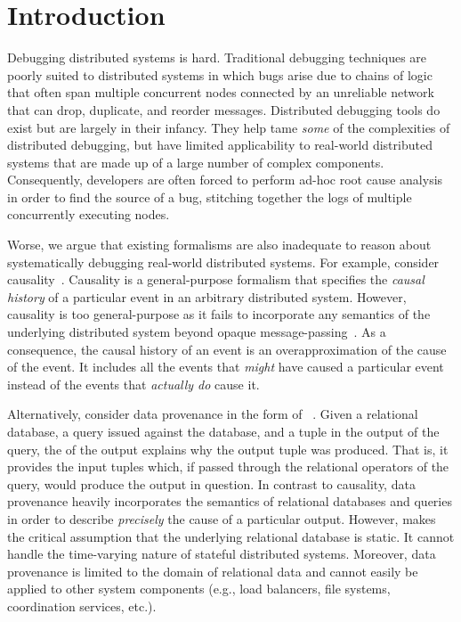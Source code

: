 \section{Introduction}
Debugging distributed systems is hard. Traditional debugging techniques are
poorly suited to distributed systems in which bugs arise due to chains of logic
that often span multiple concurrent nodes connected by an unreliable network that can
drop, duplicate, and reorder messages. Distributed debugging tools do
exist but are largely in their infancy. They help tame \emph{some} of the
complexities of distributed debugging, but have limited applicability to
real-world distributed systems that are made up of a large number of complex
components. Consequently, developers are often forced to perform ad-hoc root
cause analysis in order to find the source of a bug, stitching together the
logs of multiple concurrently executing nodes.

Worse, we argue that existing formalisms are also inadequate to reason about
systematically debugging real-world distributed systems. For example, consider
causality~\cite{lamport1978time}. Causality is a general-purpose formalism that
specifies the \emph{causal history} of a particular event in an arbitrary
distributed system. However, causality is too general-purpose as it fails to
incorporate any semantics of the underlying distributed system beyond opaque
message-passing~\cite{bailis2012potential}. As a consequence, the causal
history of an event is an overapproximation of the cause of the event. It
includes all the events that \emph{might} have caused a particular event
instead of the events that \emph{actually do} cause it.

Alternatively, consider data provenance in the form of
\emph{\whyprovenance{}}~\cite{cheney2009provenance, buneman2001and}. Given a
relational database, a query issued against the database, and a tuple in the
output of the query, the \whyprovenance{} of the output explains why the output
tuple was produced. That is, it provides the input tuples which, if passed
through the relational operators of the query, would produce the output in
question. In contrast to causality, data provenance heavily incorporates the
semantics of relational databases and queries in order to describe
\emph{precisely} the cause of a particular output. However, \whyprovenance{}
makes the critical assumption that the underlying relational database is
static. It cannot handle the time-varying nature of stateful distributed
systems. Moreover, data provenance is limited to the domain of relational data
and cannot easily be applied to other system components (e.g., load balancers,
file systems, coordination services, etc.).

